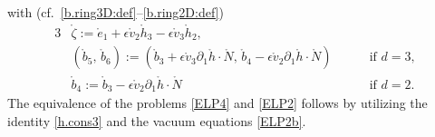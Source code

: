 \documentclass[twoside,11pt]{article}
\numberwithin{equation}{section}
\def\p{\partial}
\begin{document}
with (cf.~\eqref{b.ring3D:def}--\eqref{b.ring2D:def})
\begin{alignat}{3}
	\label{zeta:def}
&\mathring{\zeta}:=
\mathring{e}_1+\epsilon \mathring{v}_2\mathring{h}_3-\epsilon \mathring{v}_3\mathring{h}_2, && \\[1mm]	
	\nonumber
&
	(\mathring{b}_5,\,
	\mathring{b}_6)
:=
	(\mathring{b}_3+\epsilon\mathring{v}_3\p_1\mathring{h}\cdot\mathring{N},\,
	\mathring{b}_4-\epsilon\mathring{v}_2\p_1\mathring{h}\cdot\mathring{N})
 \quad  && \textrm{ if }d=3,\\[1mm]	
&\mathring{b}_4 :=\mathring{b}_3-\epsilon\mathring{v}_2\p_1\mathring{h}\cdot\mathring{N}
  && \textrm{ if }d=2.
\nonumber
\end{alignat}
The equivalence of the problems \eqref{ELP4} and \eqref{ELP2} follows by utilizing the identity \eqref{h.cons3} and the vacuum equations \eqref{ELP2b}.
\end{document}

